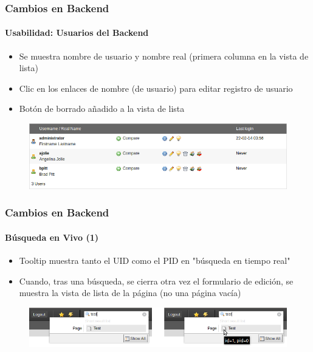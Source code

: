 
\begin{frame}[fragile]
	\frametitle{Cambios en Backend}
	\framesubtitle{Usabilidad: Usuarios del Backend}

	\begin{itemize}
		\item Se muestra nombre de usuario y nombre real\newline
		(primera columna en la vista de lista)
		\item Clic en los enlaces de nombre (de usuario) para\newline
		editar registro de usuario
		\item Botón de borrado añadido a la vista de lista

	\end{itemize}

	\begin{figure}
		\includegraphics[width=0.95\linewidth]{Images/BackendChanges/BackendUserList.png}
	\end{figure}

\end{frame}


\begin{frame}[fragile]
	\frametitle{Cambios en Backend}
	\framesubtitle{Búsqueda en Vivo (1)}

	\begin{itemize}
		\item Tooltip muestra tanto el UID como el PID en "búsqueda en tiempo real"
		\item Cuando, tras una búsqueda, se cierra otra vez el formulario de edición, se muestra la vista de lista de la página (no una página vacía)
	\end{itemize}

	\begin{figure}
		\includegraphics[width=0.8\linewidth]{Images/BackendChanges/LiveSearchTooltip.png}
	\end{figure}

\end{frame}

